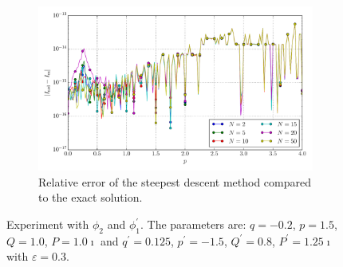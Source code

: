 \documentclass[a4paper,10pt]{article}
\begin{document}
\begin{figure}[ht!]
\begin{subfigure}[t]{0.5\linewidth}
    \includegraphics[width=\linewidth]{./plots/tp_1d_conv_p_2_1_err_rel_nsd.pdf}
    \caption{Relative error of the steepest descent method compared to the exact solution.}
    \label{fig:tp_1d_conv_p_2_1_err_rel_nsd}
  \end{subfigure}
  \label{fig:tp_1d_conv_p_2_1}
  \caption{Experiment with $\phi_{2}$ and $\phi_{1}^{\prime}$.
  The parameters are:
  $q=-0.2$, $p=1.5$, $Q=1.0$, $P=1.0\imath$ and
  $q^\prime=0.125$, $p^\prime=-1.5$, $Q^\prime=0.8$, $P^\prime=1.25\imath$
  with $\varepsilon = 0.3$.}
\end{figure}
\end{document}

